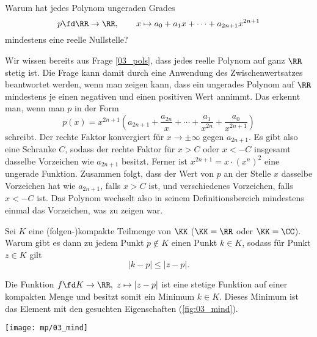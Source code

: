\begin{frage}\label{03_ponu}
  Warum hat jedes Polynom ungeraden Grades 
  \[
  p\fd \RR \to \RR,\qquad x\mapsto a_0+a_1x+\cdots + a_{2n+1} x^{2n+1}
  \]
  mindestens eine reelle Nullstelle?
\end{frage}

\begin{antwort}
  Wir wissen bereits aus Frage \ref{03_pols}, dass jedes reelle 
  Polynom auf ganz $\RR$ stetig ist. Die Frage kann damit durch eine 
  Anwendung des Zwischenwertsatzes beantwortet werden, wenn man zeigen 
  kann, dass ein ungerades Polynom auf $\RR$ mindestens je einen negativen 
  und einen positiven Wert annimmt. Das erkennt man, wenn man $p$ in der 
  Form 
  \[ p(x)=x^{2n+1} \left( a_{2n+1}+
    \frac{a_{2n}}{x}+\cdots+\frac{a_1}{x^{2n}} + \frac{a_0}{x^{2n+1}} 
  \right)
  \]
  schreibt. Der rechte Faktor konvergiert für $x \to \pm \infty $ gegen 
  $a_{2n+1}$. Es gibt also eine Schranke $C$, sodass der rechte 
  Faktor für $x>C$ oder $x<-C$ insgesamt dasselbe Vorzeichen wie $a_{2n+1}$ 
  besitzt. Ferner ist $x^{2n+1}=x\cdot (x^n)^2$ eine ungerade Funktion. 
  Zusammen folgt, dass der Wert von $p$ an der Stelle $x$ 
  dasselbe Vorzeichen hat wie $a_{2n+1}$, falls $x>C$ ist, 
  und verschiedenes Vorzeichen, falls $x<-C$ ist. Das Polynom wechselt 
  also in seinem Definitionsbereich mindestens einmal das Vorzeichen, was 
  zu zeigen war. 
  \AntEnd
\end{antwort}


\begin{frage}\label{03_anw}
  Sei $K$ eine (folgen-)kompakte Teilmenge von $\KK$ ($\KK=\RR$ oder 
  $\KK=\CC$). Warum gibt es dann zu jedem Punkt $p\not\in K$ einen Punkt 
  $k\in K$, sodass für  Punkt $z\in K$ gilt 
  \[ |k-p| \le |z-p|. \]
\end{frage}

\begin{antwort}
  Die Funktion 
  $f\fd K \to \RR, \; z \mapsto |z-p|$ 
  ist eine stetige Funktion auf einer kompakten Menge und besitzt somit 
  ein Minimum $k\in K$. Dieses Minimum ist das
  Element mit den gesuchten Eigenschaften (\sieheAbbildung\ref{fig:03_mind}).

  \begin{center}
    \texttt{[image: mp/03\_mind]}
    \label{fig:03_mind}
  \end{center}
\end{antwort}

